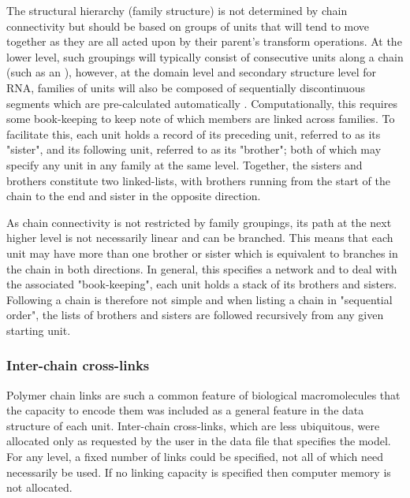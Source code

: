 The structural hierarchy (family structure) is not determined by chain
connectivity but should be based on groups of units that will tend to move
together as they are all acted upon by their parent's transform operations.
At the lower level, such groupings will typically consist of consecutive 
units along a chain (such as an \AH), however, at the domain level and
secondary structure level for RNA, families of units will also be composed of
sequentially discontinuous segments which are pre-calculated automatically \cite{TaylorWR99b}.   
Computationally, this requires some
book-keeping to keep note of which members are linked across families.  To
facilitate this, each unit holds a record of its preceding unit, referred to
as its "sister", and its following unit, referred to as its "brother"; both
of which may specify any unit in any family at the same level.  Together,
the sisters and brothers constitute two linked-lists, with brothers running
from the start of the chain to the end and sister in the opposite direction.

As chain connectivity is not restricted by family groupings, its path at 
the next higher level is not necessarily linear and can be branched.  This
means that each unit may have more than one brother or sister which is
equivalent to branches in the chain in both directions.  In general, this
specifies a network and to deal with the associated "book-keeping", each
unit holds a stack of its brothers and sisters.   Following a chain is therefore
not simple and when listing a chain in "sequential order", the lists of brothers
and sisters are followed recursively from any given starting unit.

\subsubsection{Inter-chain cross-links}

Polymer chain links are such a common feature of biological macromolecules that
the capacity to encode them was included as a general feature in the data structure
of each unit.   Inter-chain cross-links, which are less ubiquitous, were allocated
only as requested by the user in the data file that specifies the model.  For any
level, a fixed number of links could be specified, not all of which need necessarily
be used.   If no linking capacity is specified then computer memory is not
allocated.

